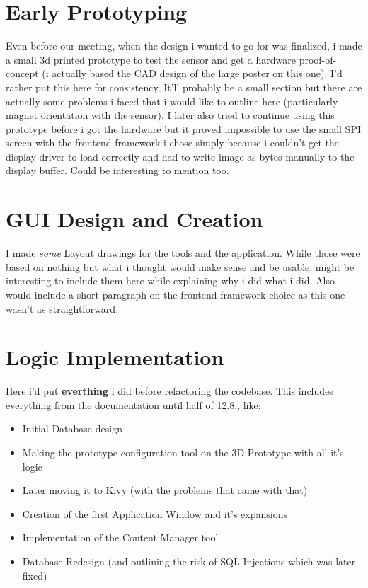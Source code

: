 \section{Early Prototyping}
Even before our meeting, when the design i wanted to go for was finalized, i made a small 3d printed prototype to test the sensor and get a hardware proof-of-concept (i actually based the CAD design of the large poster on this one). I'd rather put this here for consistency. It'll probably be a small section but there are actually some problems i faced that i would like to outline here (particularly magnet orientation with the sensor). I later also tried to continue using this prototype before i got the hardware but it proved impossible to use the small SPI screen with the frontend framework i chose simply because i couldn't get the display driver to load correctly and had to write image as bytes manually to the display buffer. Could be interesting to mention too.
\section{GUI Design and Creation}
I made \textit{some} Layout drawings for the tools and the application. While those were based on nothing but what i thought would make sense and be usable, might be interesting to include them here while explaining why i did what i did.
Also would include a short paragraph on the frontend framework choice as this one wasn't as straightforward.
\section{Logic Implementation}
Here i'd put \textbf{everthing} i did before refactoring the codebase. This includes everything from the documentation until half of 12.8., like:
\begin{itemize}
	\item Initial Database design
	\item Making the prototype configuration tool on the 3D Prototype with all it's logic 
	\item Later moving it to Kivy (with the problems that came with that)
	\item Creation of the first Application Window and it's expansions
	\item Implementation of the Content Manager tool
	\item Database Redesign (and outlining the risk of SQL Injections which was later fixed)
\end{itemize}

